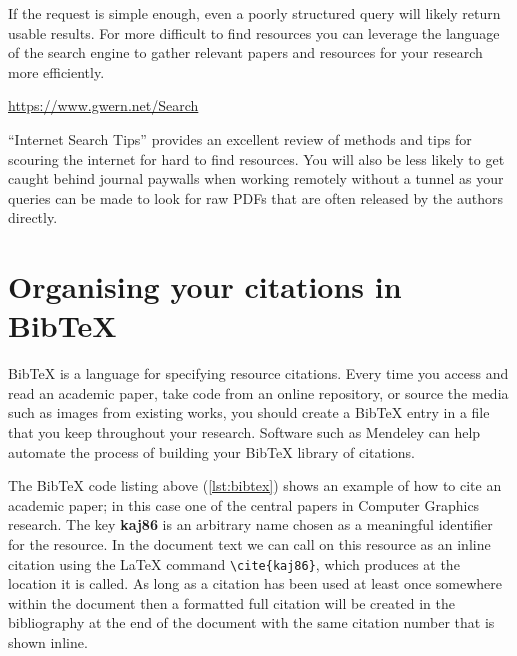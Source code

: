 If the request is simple enough, even a poorly structured query will likely return usable results.
For more difficult to find resources you can leverage the language of the search engine to gather relevant papers and resources for your research more efficiently. 
		
		\begin{center}
		{\small \url{https://www.gwern.net/Search}}
		\end{center}
		
``Internet Search Tips'' \cite{gwern} provides an excellent review of methods and tips for scouring the internet for hard to find resources.
You will also be less likely to get caught behind journal paywalls when working remotely without a tunnel as your queries can be made to look for raw PDFs that are often released by the authors directly.


	\section{Organising your citations in Bib\TeX{}}
		\label{sec:resources_bibtex}
	
Bib\TeX{} is a language for specifying resource citations.
Every time you access and read an academic paper, take code from an online repository, or source the media such as images from existing works, you should create a Bib\TeX{} entry in a file that you keep throughout your research.
Software such as Mendeley \cite{mendeley} can help automate the process of building your Bib\TeX{} library of citations. 
		
		
		
The Bib\TeX{} code listing above (\cref{lst:bibtex}) shows an example of how to cite an academic paper; in this case one of the central papers in Computer Graphics research.
The key \textbf{kaj86} is an arbitrary name chosen as a meaningful identifier for the resource.
In the document text we can call on this resource as an inline citation using the \LaTeX{} command \lstinline|\cite{kaj86}|, which produces \cite{kaj86} at the location it is called.
As long as a citation has been used at least once somewhere within the document then a formatted full citation will be created in the bibliography at the end of the document with the same citation number that is shown inline.
		
